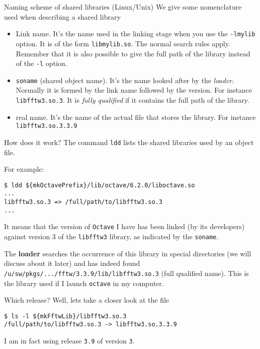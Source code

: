 \documentclass[10pt]{beamer}
\begin{document}
\begin{frame}{Naming scheme of shared libraries (Linux/Unix)}
  We give some nomenclature used when describing a shared library

  \begin{itemize}
  \item Link name. It's the name used in the linking stage when
    you use the \texttt{-lmylib} option.  It is of the
    form \texttt{libmylib.so}. The normal search rules
    apply. Remember that it is also possible to give the full path of
    the library instead of the \texttt{-l} option.
  \item \texttt{soname} (shared object name).  It's the name looked after
    by the \emph{loader}.  Normally it is formed by the link name
    followed by the version.  For instance
    \texttt{libfftw3.so.3}. It is \emph{fully
    qualified} if it contains the full path of the library.
  \item real name. It's the name of the actual file that stores the library. 
    For instance \texttt{libfftw3.so.3.3.9}
  \end{itemize}
\end{frame}


\begin{frame}[fragile]{How does it work?}  The command
  \texttt{ldd} lists the shared libraries used by an object file.

  For example:
\begin{verbatim}
$ ldd ${mkOctavePrefix}/lib/octave/6.2.0/liboctave.so
...
libfftw3.so.3 => /full/path/to/libfftw3.so.3
...
\end{verbatim}
It means that the version of \texttt{Octave} I have has been linked (by its
developers) against version $3$ of the \texttt{libfftw3} library, 
as indicated by the \texttt{soname}.

The \textbf{loader} searches the occurrence of this library in special
directories (we will discuss about it later) and has indeed found
\texttt{/u/sw/pkgs/.../fftw/3.3.9/lib/libfftw3.so.3} (full qualified name). This is the library used if I launch \texttt{octave} in my computer. \smallskip

Which release? Well, lets take a closer look at the file
\begin{verbatim}
$ ls -l ${mkFftwLib}/libfftw3.so.3
/full/path/to/libfftw3.so.3 -> libfftw3.so.3.3.9
\end{verbatim}
I am in fact using release \texttt{3.9} of version \texttt{3}.
\end{frame}
\end{document}
